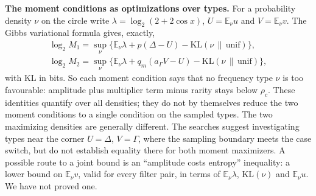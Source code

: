 \documentclass[11pt]{article}
\newcommand{\E}{\mathbb{E}}
\newcommand{\KL}{\mathrm{KL}}
\theoremstyle{plain}
\begin{document}
\textbf{The moment conditions as optimizations over types.} For a probability density $\nu$ on the circle write $\lambda = \log_2(2+2\cos x)$, $U = \E_\nu u$ and $V = \E_\nu v$. The Gibbs variational formula gives, exactly,
\begin{gather*}
\log_2 M_1 = \sup_\nu \bigl\{\E_\nu \lambda + p(\Delta - U) - \KL(\nu \,\|\, \mathrm{unif})\bigr\}, \\
\log_2 M_2 = \sup_\nu \bigl\{\E_\nu \lambda + q_m(a_\Gamma V - U) - \KL(\nu \,\|\, \mathrm{unif})\bigr\},
\end{gather*}
with $\KL$ in bits. So each moment condition says that no frequency type $\nu$ is too favourable: amplitude plus multiplier term minus rarity stays below $\rho_c$. These identities quantify over all densities; they do not by themselves reduce the two moment conditions to a single condition on the sampled types. The two maximizing densities are generally different. The searches suggest investigating types near the corner $U=\Delta$, $V=\Gamma$, where the sampling boundary meets the case switch, but do not establish equality there for both moment maximizers. A possible route to a joint bound is an ``amplitude costs entropy'' inequality: a lower bound on $\E_\nu v$, valid for every filter pair, in terms of $\E_\nu\lambda$, $\KL(\nu)$ and $\E_\nu u$. We have not proved one.
\end{document}
